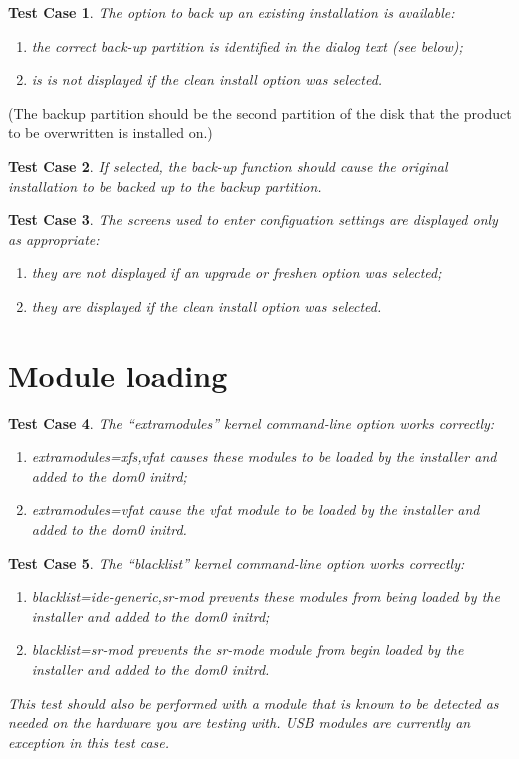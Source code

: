 \documentclass[a4paper]{article}
\newtheorem{testcase}{Test Case}
\begin{document}
\begin{testcase}
The option to back up an existing installation is available:
\begin{enumerate}
\item the correct back-up partition is identified in the dialog text
  (see below);
\item is is not displayed if the clean install option was selected.
\end{enumerate}
\end{testcase}
(The backup partition should be the second partition of the disk that
the product to be overwritten is installed on.)

\begin{testcase}
If selected, the back-up function should cause the original
installation to be backed up to the backup partition.
\end{testcase}

\begin{testcase}
The screens used to enter configuation settings are displayed only as
appropriate:
\begin{enumerate}
\item they are not displayed if an upgrade or freshen option was selected;
\item they are displayed if the clean install option was selected.
\end{enumerate}
\end{testcase}


\section{Module loading}

\begin{testcase}
The ``extramodules'' kernel command-line option works correctly:
\begin{enumerate}
\item extramodules=xfs,vfat causes these modules to be loaded by the
  installer and added to the dom0 initrd;
\item extramodules=vfat cause the vfat module to be loaded by the
  installer and added to the dom0 initrd.
\end{enumerate}
\end{testcase}

\begin{testcase}
The ``blacklist'' kernel command-line option works correctly:
\begin{enumerate}
\item blacklist=ide-generic,sr-mod prevents these modules from being
  loaded by the installer and added to the dom0 initrd;
\item blacklist=sr-mod prevents the sr-mode module from begin loaded
  by the installer and added to the dom0 initrd.
\end{enumerate}
This test should also be performed with a module that is known to be
detected as needed on the hardware you are testing with.  USB modules
are currently an exception in this test case.
\end{testcase}
\end{document}
